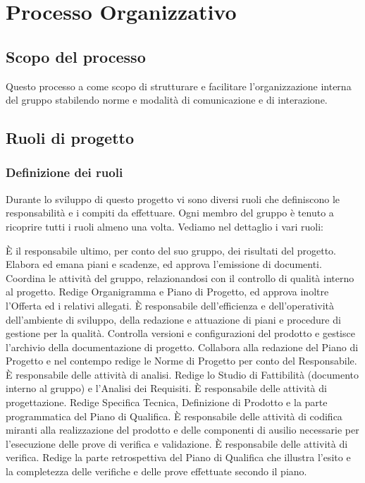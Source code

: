\documentclass[a4paper,11pt]{article}
\begin{document}
	\section{Processo Organizzativo}
		\subsection{Scopo del processo}
		Questo processo a come scopo di strutturare e facilitare l'organizzazione interna del gruppo stabilendo norme e modalità di comunicazione e di interazione.
		
		
		\subsection{Ruoli di progetto}
				\subsubsection{Definizione dei ruoli}
		Durante lo sviluppo di questo progetto vi sono diversi ruoli che  definiscono le responsabilità e i compiti da effettuare. Ogni membro del gruppo è tenuto a ricoprire tutti i ruoli almeno una volta. Vediamo nel dettaglio i vari ruoli:
		
		È il responsabile ultimo, per conto del suo gruppo, dei risultati del progetto.
Elabora ed emana piani e scadenze, ed approva l'emissione di documenti. 
Coordina le attività del gruppo, relazionandosi con il controllo di qualità interno al progetto. 
Redige Organigramma e Piano di Progetto, ed approva inoltre l'Offerta ed i relativi allegati.
			È responsabile dell'efficienza e dell'operatività dell'ambiente di sviluppo, della redazione e attuazione di piani e procedure di gestione per la qualità.
Controlla versioni e configurazioni del prodotto e gestisce l'archivio della documentazione di progetto. 
Collabora alla redazione del Piano di Progetto e nel contempo redige le Norme di Progetto per conto del Responsabile.
			È responsabile delle attività di analisi. 
Redige lo Studio di Fattibilità (documento interno al gruppo) e l'Analisi dei Requisiti.
			È responsabile delle attività di progettazione. 
Redige Specifica Tecnica, Definizione di Prodotto e la parte programmatica del Piano di Qualifica.
			È responsabile delle attività di codifica miranti alla realizzazione del prodotto e delle componenti di ausilio necessarie per l'esecuzione delle prove di verifica e validazione.
			È responsabile delle attività di verifica.
Redige la parte retrospettiva del Piano di Qualifica che illustra l'esito e la completezza delle verifiche e delle prove effettuate secondo il piano.
		
\end{document}
